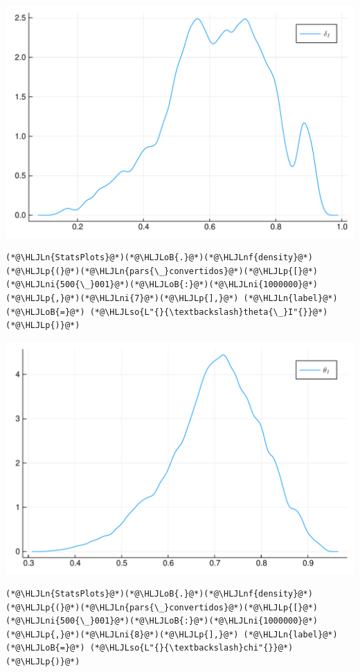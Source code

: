 \documentclass[12pt,a4paper]{article}
\newcommand{\HLJLn}[1]{#1}
\newcommand{\HLJLnf}[1]{\textcolor[RGB]{66,102,213}{#1}}
\newcommand{\HLJLso}[1]{\textcolor[RGB]{201,61,57}{#1}}
\newcommand{\HLJLni}[1]{\textcolor[RGB]{59,151,46}{#1}}
\newcommand{\HLJLoB}[1]{\textcolor[RGB]{102,102,102}{\textbf{#1}}}
\newcommand{\HLJLp}[1]{#1}
\begin{document}
\includegraphics[width=\linewidth]{figures/carlos_mcmc_7_1.pdf}

\begin{lstlisting}
(*@\HLJLn{StatsPlots}@*)(*@\HLJLoB{.}@*)(*@\HLJLnf{density}@*)(*@\HLJLp{(}@*)(*@\HLJLn{pars{\_}convertidos}@*)(*@\HLJLp{[}@*)(*@\HLJLni{500{\_}001}@*)(*@\HLJLoB{:}@*)(*@\HLJLni{1000000}@*)(*@\HLJLp{,}@*)(*@\HLJLni{7}@*)(*@\HLJLp{],}@*) (*@\HLJLn{label}@*)(*@\HLJLoB{=}@*) (*@\HLJLso{L"{}{\textbackslash}theta{\_}I"{}}@*)(*@\HLJLp{)}@*)
\end{lstlisting}

\includegraphics[width=\linewidth]{figures/carlos_mcmc_8_1.pdf}

\begin{lstlisting}
(*@\HLJLn{StatsPlots}@*)(*@\HLJLoB{.}@*)(*@\HLJLnf{density}@*)(*@\HLJLp{(}@*)(*@\HLJLn{pars{\_}convertidos}@*)(*@\HLJLp{[}@*)(*@\HLJLni{500{\_}001}@*)(*@\HLJLoB{:}@*)(*@\HLJLni{1000000}@*)(*@\HLJLp{,}@*)(*@\HLJLni{8}@*)(*@\HLJLp{],}@*) (*@\HLJLn{label}@*)(*@\HLJLoB{=}@*) (*@\HLJLso{L"{}{\textbackslash}chi"{}}@*)(*@\HLJLp{)}@*)
\end{lstlisting}
\end{document}
